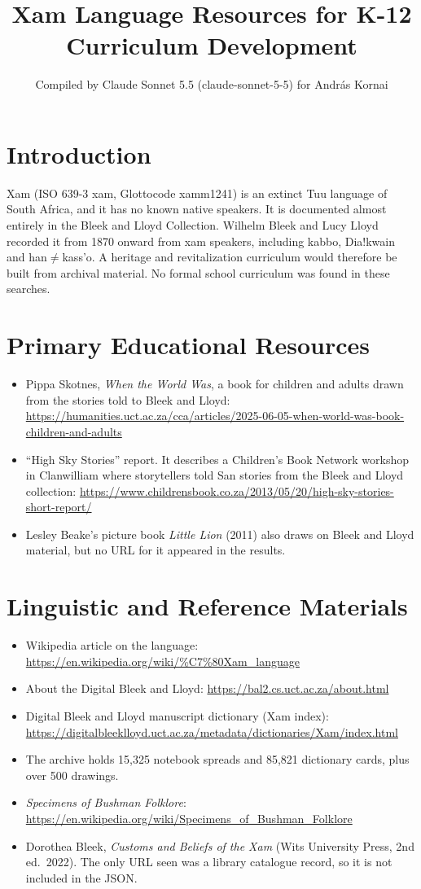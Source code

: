 \documentclass[12pt]{article}
\title{\textbar Xam Language Resources for K-12 Curriculum Development}
\author{Compiled by Claude Sonnet 5.5 (claude-sonnet-5-5) for Andr\'as Kornai}
\date{}
\begin{document}
\maketitle

\section{Introduction}
\textbar Xam (ISO 639-3 xam, Glottocode xamm1241) is an extinct Tuu language of South Africa, and it has no known native speakers. It is documented almost entirely in the Bleek and Lloyd Collection. Wilhelm Bleek and Lucy Lloyd recorded it from 1870 onward from \textbar xam speakers, including \textbar\textbar kabbo, Dia!kwain and \textbar han$\neq$kass'o. A heritage and revitalization curriculum would therefore be built from archival material. No formal school curriculum was found in these searches.

\section{Primary Educational Resources}
\begin{itemize}
\item Pippa Skotnes, \emph{When the World Was}, a book for children and adults drawn from the stories told to Bleek and Lloyd: \url{https://humanities.uct.ac.za/cca/articles/2025-06-05-when-world-was-book-children-and-adults}
\item ``High Sky Stories'' report. It describes a Children's Book Network workshop in Clanwilliam where storytellers told San stories from the Bleek and Lloyd collection: \url{https://www.childrensbook.co.za/2013/05/20/high-sky-stories-short-report/}
\item Lesley Beake's picture book \emph{Little Lion} (2011) also draws on Bleek and Lloyd material, but no URL for it appeared in the results.
\end{itemize}

\section{Linguistic and Reference Materials}
\begin{itemize}
\item Wikipedia article on the language: \url{https://en.wikipedia.org/wiki/%C7%80Xam_language}
\item About the Digital Bleek and Lloyd: \url{https://bal2.cs.uct.ac.za/about.html}
\item Digital Bleek and Lloyd manuscript dictionary (\textbar Xam index): \url{https://digitalbleeklloyd.uct.ac.za/metadata/dictionaries/Xam/index.html}
\item The archive holds 15,325 notebook spreads and 85,821 dictionary cards, plus over 500 drawings.
\item \emph{Specimens of Bushman Folklore}: \url{https://en.wikipedia.org/wiki/Specimens_of_Bushman_Folklore}
\item Dorothea Bleek, \emph{Customs and Beliefs of the \textbar Xam} (Wits University Press, 2nd ed.\ 2022). The only URL seen was a library catalogue record, so it is not included in the JSON.
\end{itemize}
\end{document}
